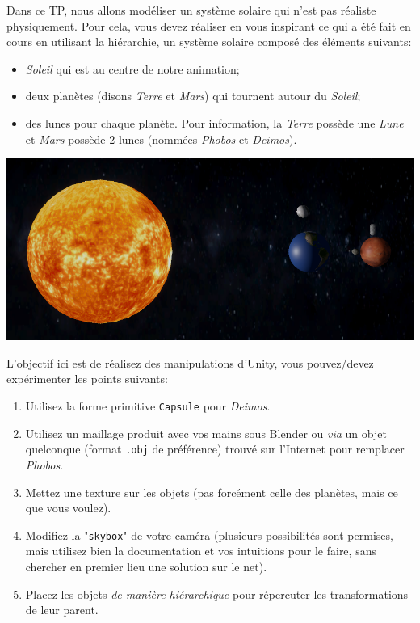 \documentclass[a4paper,10pt]{article}
\begin{document}
Dans ce TP, nous allons modéliser un système solaire qui n'est pas réaliste physiquement. Pour cela, vous devez réaliser en vous inspirant ce qui a été fait en cours en utilisant la hiérarchie, un système solaire composé des éléments suivants:
\begin{itemize}
	\item \textit{Soleil} qui est au centre de notre animation;
	\item deux planètes (disons \textit{Terre} et \textit{Mars}) qui tournent autour du \textit{Soleil};
	\item des lunes pour chaque planète. Pour information, la \textit{Terre} possède une \textit{Lune} et \textit{Mars} possède 2 lunes (nommées \textit{Phobos} et \textit{Deimos}). 
\end{itemize}


\begin{center}
	\includegraphics[width=0.7\linewidth]{fig/solar-system}
\end{center}


L'objectif ici est de réalisez des manipulations d'Unity, vous pouvez/devez expérimenter les points suivants:
\begin{enumerate}
	\item Utilisez la forme primitive \texttt{Capsule} pour \textit{Deimos}.
	\item Utilisez un maillage produit avec vos mains sous Blender ou \textit{via} un objet quelconque (format \texttt{.obj} de préférence) trouvé sur l'Internet pour remplacer \textit{Phobos}.
	\item Mettez une texture sur les objets (pas forcément celle des planètes, mais ce que vous voulez).
	\item Modifiez la "\texttt{skybox}" de votre caméra (plusieurs possibilités sont permises, mais utilisez bien la documentation et vos intuitions pour le faire, sans chercher en premier lieu une solution sur le net).
	\item Placez les objets \textit{de manière hiérarchique} pour répercuter les transformations de leur parent.
\end{enumerate}
\end{document}
